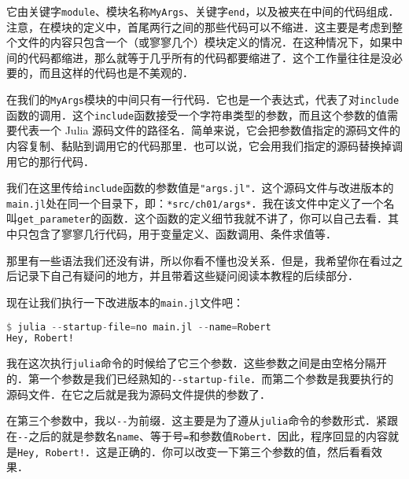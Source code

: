 它由关键字\verb|module|、模块名称\verb|MyArgs|、关键字\verb|end|，以及被夹在中间的代码组成．注意，在模块的定义中，首尾两行之间的那些代码可以不缩进．这主要是考虑到整个文件的内容只包含一个（或寥寥几个）模块定义的情况．在这种情况下，如果中间的代码都缩进，那么就等于几乎所有的代码都要缩进了．这个工作量往往是没必要的，而且这样的代码也是不美观的．

在我们的\verb|MyArgs|模块的中间只有一行代码．它也是一个表达式，代表了对\verb|include|函数的调用．这个\verb|include|函数接受一个字符串类型的参数，而且这个参数的值需要代表一个 Julia 源码文件的路径名．简单来说，它会把参数值指定的源码文件的内容复制、黏贴到调用它的代码那里．也可以说，它会用我们指定的源码替换掉调用它的那行代码．

我们在这里传给\verb|include|函数的参数值是\verb|"args.jl"|．这个源码文件与改进版本的\verb|main.jl|处在同一个目录下，即：\verb|*src/ch01/args*|．我在该文件中定义了一个名叫\verb|get_parameter|的函数．这个函数的定义细节我就不讲了，你可以自己去看．其中只包含了寥寥几行代码，用于变量定义、函数调用、条件求值等．

那里有一些语法我们还没有讲，所以你看不懂也没关系．但是，我希望你在看过之后记录下自己有疑问的地方，并且带着这些疑问阅读本教程的后续部分．

现在让我们执行一下改进版本的\verb|main.jl|文件吧：

\begin{lstlisting}[language=julia]
$ julia --startup-file=no main.jl --name=Robert 
Hey, Robert!
\end{lstlisting}

我在这次执行\verb|julia|命令的时候给了它三个参数．这些参数之间是由空格分隔开的．第一个参数是我们已经熟知的\verb|--startup-file|．而第二个参数是我要执行的源码文件．在它之后就是我为源码文件提供的参数了．

在第三个参数中，我以\verb|--|为前缀．这主要是为了遵从\verb|julia|命令的参数形式．紧跟在\verb|--|之后的就是参数名\verb|name|、等于号\verb|=|和参数值\verb|Robert|．因此，程序回显的内容就是\verb|Hey, Robert!|．这是正确的．你可以改变一下第三个参数的值，然后看看效果．